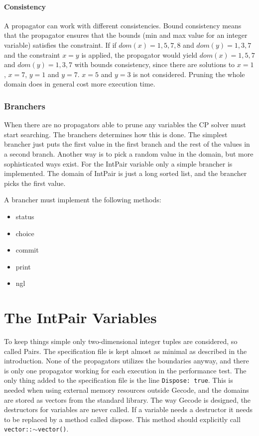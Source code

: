 \documentclass[a4paper,11pt]{article}
\begin{document}
\paragraph{Consistency}
A propagator can work with different consistencies. Bound consistency means that the propagator ensures that the bounds (min and max value for an integer variable) satisfies the constraint. If if $dom(x)={1,5,7,8}$ and $dom(y)={1,3,7}$ and the constraint $x=y$ is applied, the propagator would yield $dom(x)={1,5,7}$ and $dom(y)={1,3,7}$ with bounds consistency, since there are solutions to $x=1$, $x=7$, $y=1$ and $y=7$. $x=5$ and $y=3$ is not considered. Pruning the whole domain does in general cost more execution time.

\subsubsection{Branchers}
When there are no propagators able to prune any variables the CP solver must start searching. The branchers determines how this is done. The simplest brancher just puts the first value in the first branch and the rest of the values in a second branch. Another way is to pick a random value in the domain, but more sophisticated ways exist. For the IntPair variable only a simple brancher is implemented. The domain of IntPair is just a long sorted list, and the brancher picks the first value.

A brancher must implement the following methods:
\begin{itemize}
\item{status}
\item{choice}
\item{commit}
\item{print}
\item{ngl}
\end{itemize}

\section{The IntPair Variables}
To keep things simple only two-dimensional integer tuples are considered, so called Pairs. The specification file is kept almost as minimal as described in the introduction. None of the propagators utilizes the boundaries anyway, and there is only one propagator working for each execution in the performance test. The only thing added to the specification file is the line \texttt{Dispose: true}. This is needed when using external memory resources outside Gecode, and the domains are stored as vectors from the standard library. The way Gecode is designed, the destructors for variables are never called. If a variable needs a destructor it needs to be replaced by a method called dispose. This method should explicitly call \texttt{vector::$\sim$vector()}.
\end{document}
